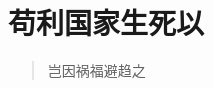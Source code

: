 \documentclass{article}
\title{
\vspace{2in}
\huge{\textbf{\hmwkClass \  \hmwkTitle}}\\
\Large\vspace{0.1in}\large{\hmwkSupplement}\\
\vspace{2.5in}
}
\author{\textbf{\hmwkAuthorName}}
\date{\hmwkClassTime}
\begin{document}
\maketitle
\thispagestyle{empty}

\newpage
\tableofcontents
\newpage

\section{苟利国家生死以}
\begin{quote}
    岂因祸福避趋之
\end{quote}
\end{document}
